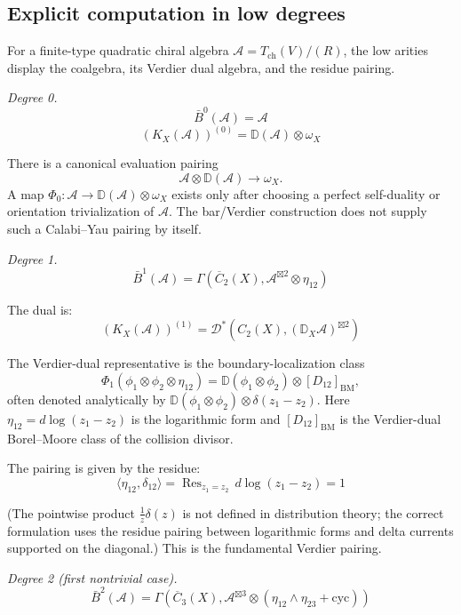 \subsection{Explicit computation in low degrees}

\begin{computation}\label{comp:bar-dual-low-degrees}
For a finite-type quadratic chiral algebra
$\mathcal{A}=T_{\mathrm{ch}}(V)/(R)$, the low arities display the
coalgebra, its Verdier dual algebra, and the residue pairing.

\emph{Degree 0.}
\[\bar{B}^0(\mathcal{A}) = \mathcal{A}\]
\[(K_X(\mathcal A))^{(0)} = \mathbb{D}(\mathcal{A}) \otimes \omega_X\]

There is a canonical evaluation pairing
\[
\mathcal{A}\otimes \mathbb{D}(\mathcal{A})\longrightarrow\omega_X .
\]
A map
$\Phi_0\colon\mathcal{A}\to\mathbb{D}(\mathcal{A})\otimes\omega_X$
exists only after choosing a perfect self-duality or orientation
trivialization of $\mathcal{A}$. The bar/Verdier construction does
not supply such a Calabi--Yau pairing by itself.

\emph{Degree 1.}
\[\bar{B}^1(\mathcal{A}) = \Gamma(\overline{C}_2(X), \mathcal{A}^{\boxtimes 2} \otimes \eta_{12})\]

The dual is:
\[(K_X(\mathcal A))^{(1)}
= \mathcal{D}^*(C_2(X), (\mathbb{D}_X\mathcal{A})^{\boxtimes 2})\]

The Verdier-dual representative is the boundary-localization class
\[
\Phi_1(\phi_1 \otimes \phi_2 \otimes \eta_{12})
=
\mathbb{D}(\phi_1 \otimes \phi_2)\otimes [D_{12}]_{\mathrm{BM}},
\]
often denoted analytically by
$\mathbb{D}(\phi_1\otimes\phi_2)\otimes\delta(z_1-z_2)$.
Here $\eta_{12}=d\log(z_1-z_2)$ is the logarithmic form and
$[D_{12}]_{\mathrm{BM}}$ is the Verdier-dual Borel--Moore class of
the collision divisor.

The pairing is given by the residue:
\[\langle \eta_{12}, \delta_{12} \rangle = \operatorname{Res}_{z_1 = z_2}\, d\log(z_1 - z_2) = 1\]

(The pointwise product $\frac{1}{z}\delta(z)$ is not defined in distribution theory;
the correct formulation uses the residue pairing between logarithmic forms and
delta currents supported on the diagonal.) This is the fundamental Verdier pairing.

\emph{Degree 2 (first nontrivial case).}
\[\bar{B}^2(\mathcal{A}) = \Gamma(\overline{C}_3(X), \mathcal{A}^{\boxtimes 3} \otimes (\eta_{12} \wedge \eta_{23} + \text{cyc}))\]


\end{computation}
